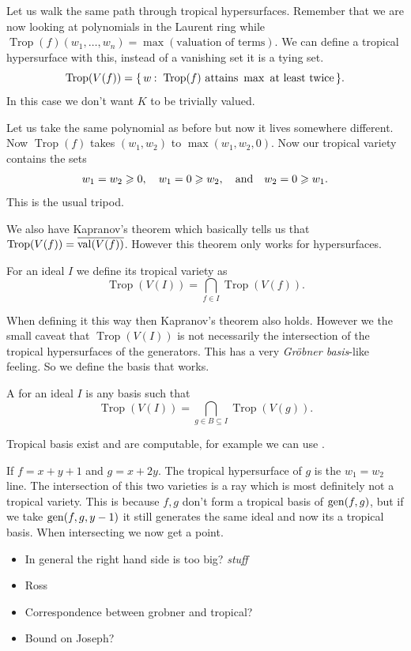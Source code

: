 \documentclass[12pt]{memoir}
\DeclareMathOperator{\val}{val}
\DeclareMathOperator{\Trop}{Trop}
\theoremstyle{definition}
\begin{document}
Let us walk the same path through tropical hypersurfaces. Remember that we are now looking at polynomials in the Laurent ring while $\Trop(f)(w_1,\dots,w_n)=\max(\text{valuation of terms})$. We can define a tropical hypersurface with this, instead of a vanishing set it is a tying set. 
$$\Trop(V(f))=\set{w\:\ \Trop(f)\text{ attains }\max\text{ at least twice}}.$$
In this case we don't want $K$ to be trivially valued.

\begin{Ex}
    Let us take the same polynomial as before but now it lives somewhere different. Now $\Trop(f)$ takes $(w_1,w_2)$ to $\max(w_1,w_2,0)$. Now our tropical variety contains the sets 
    $$w_1=w_2\geqslant 0,\quad w_1=0\geqslant w_2,\quad\text{and}\quad w_2=0\geqslant w_1.$$
    This is the usual tripod.
\end{Ex}

We also have Kapranov's theorem which basically tells us that $\Trop(V(f))=\ov{\val(V(f))}$. However this theorem only works for hypersurfaces.

\begin{Def}
    For an ideal $I$ we define its tropical variety as 
    $$\Trop(V(I))=\bigcap_{f\in I}\Trop(V(f)).$$
\end{Def}

When defining it this way then Kapranov's theorem also holds. However we the small caveat that $\Trop(V(I))$ is not necessarily the intersection of the tropical hypersurfaces of the generators. This has a very \emph{Gr\"obner basis}-like feeling. So we define the basis that works. 

\begin{Def}
    A  for an ideal $I$ is any basis such that 
    $$\Trop(V(I))=\bigcap_{g\in B\subseteq I}\Trop(V(g)).$$
\end{Def}

Tropical basis exist and are computable, for example we can use .
\begin{Ex}
    If $f=x+y+1$ and $g=x+2y$. The tropical hypersurface of $g$ is the $w_1=w_2$ line. The intersection of this two varieties is a ray which is most definitely not a tropical variety. This is because $f,g$ don't form a tropical basis of $\operatorname{gen}(f,g)$, but if we take $\operatorname{gen}(f,g,y-1)$ it still generates the same ideal and now its a tropical basis. When intersecting we now get a point.
\end{Ex}

\begin{itemize}
    \item In general the right hand side is too big? \emph{stuff}
    \item Ross 
    \item Correspondence between grobner and tropical? 
    \item Bound on Joseph?
\end{itemize}
\end{document}
